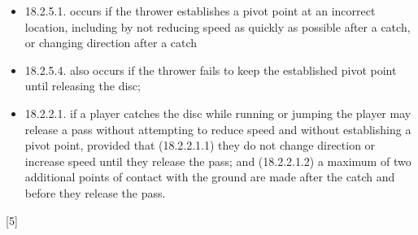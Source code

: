 \begin{itemize}[noitemsep]
        \begin{itemize}
            \item 18.2.5.1. occurs if the thrower establishes a pivot point at an incorrect location, including by not reducing speed as quickly as possible after a catch, or changing direction after a catch
            \item 18.2.5.4. also occurs if the thrower fails to keep the established pivot point until releasing the disc;
            \item 18.2.2.1. if a player catches the disc while running or jumping the player may release a pass without attempting to reduce speed and without establishing a pivot point, provided that (18.2.2.1.1) they do not change direction or increase speed until they release the pass; and (18.2.2.1.2) a maximum of two additional points of contact with the ground are made after the catch and before they release the pass.
        \end{itemize}
\end{itemize}
\begin{center}[5]\end{center}
